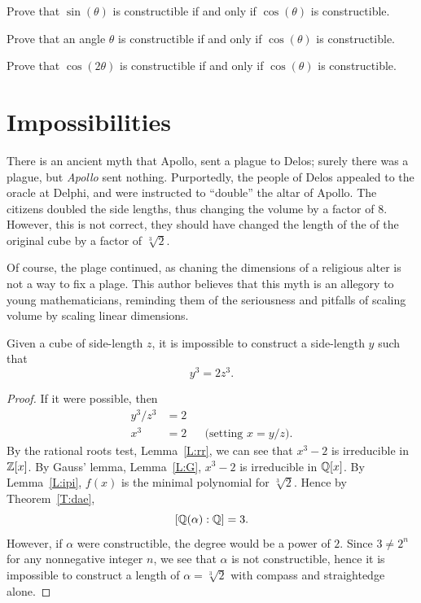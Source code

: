\documentclass{ximera}
\begin{document}
\begin{exercise}
  Prove that $\sin(\theta)$ is constructible if and only if
  $\cos(\theta)$ is constructible.
\end{exercise}

\begin{exercise}
  Prove that an angle $\theta$ is constructible if and only if
  $\cos(\theta)$ is constructible.
\end{exercise}

\begin{exercise}
  Prove that $\cos(2\theta)$ is constructible if and only if
  $\cos(\theta)$ is constructible.
\end{exercise}

\section{Impossibilities}


There is an ancient myth that Apollo, sent a plague to Delos; surely
there was a plague, but \textit{Apollo} sent nothing. Purportedly, the
people of Delos appealed to the oracle at Delphi, and were instructed
to ``double'' the altar of Apollo. The citizens doubled the side
lengths, thus changing the volume by a factor of $8$. However, this is
not correct, they should have changed the length of the of the
original cube by a factor of $\sqrt[3]{2}$.

Of course, the plage continued, as chaning the dimensions of a
religious alter is not a way to fix a plage.  This author believes
that this myth is an allegory to young mathematicians, reminding them
of the seriousness and pitfalls of scaling volume by scaling linear
dimensions.


\begin{example}
Given a cube of side-length $z$, it is impossible to construct a
side-length $y$ such that
\[
y^3 = 2 z^3.
\]
\begin{proof}
  If it were possible, then
  \begin{align*}
    y^3/z^3 &= 2\\
    x^3 &= 2 & & \text{(setting $x=y/z$)}.
  \end{align*}
  By the rational roots test, Lemma~\ref{L:rr}, we can see that $x^3-2$
  is irreducible in $\mathbb Z[x]$. By Gauss' lemma, Lemma~\ref{L:G}, $x^3-2$
  is irreducible in $\mathbb Q[x]$. By Lemma~\ref{L:ipi}, $f(x)$ is the minimal
  polynomial for $\sqrt[3]{2}$. Hence by Theorem~\ref{T:dae},
  \[
    [\mathbb Q(\alpha):\mathbb Q]=3.
    \]
    However, if $\alpha$ were constructible, the
    degree would be a power of $2$. Since $3\ne 2^n$ for any nonnegative
    integer $n$, we see that $\alpha$ is not constructible, hence it is
    impossible to construct a length of $\alpha = \sqrt[3]{2}$ with
    compass and straightedge alone.
\end{proof}
\end{example}
\end{document}
